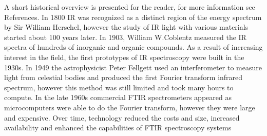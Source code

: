 \documentclass[reprint,amsmath,amssymb,aps, prl]{revtex4-2}
\begin{document}
A short historical overview is presented for the reader, for more information see References.
In 1800 IR was recognized as a distinct region of the energy spectrum by Sir William Herschel, however the study of IR light with various materials started about 100 years later. In 1903, William W.Coblentz measured the IR spectra of hundreds of inorganic and organic compounds.
As a result of increasing interest in the field, the first prototypes of IR spectroscopy were built in the 1930s.  In 1949 the astrophysicist Peter Fellgett used an interferometer to measure light from celestial bodies and produced the first Fourier transform infrared spectrum, however this method was still limited and took many hours to compute. In the late 1960s commercial FTIR spectrometers appeared as
microcomputers were able to do the Fourier transform, however
they were large and expensive. Over time, technology reduced the costs and size,
increased availability and enhanced the capabilities of FTIR spectroscopy systems\cite{spechistory}
\end{document}
